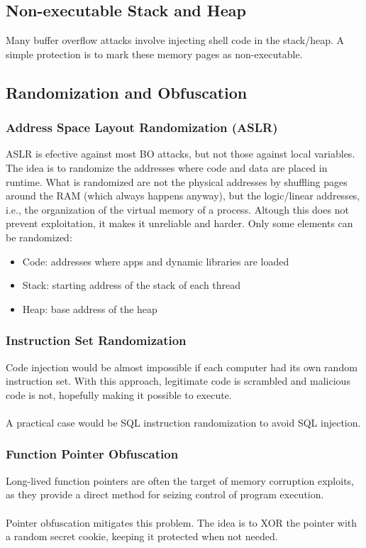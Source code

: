 \documentclass[10pt,a4paper]{report}
\begin{document}
\subsection{Non-executable Stack and Heap}
Many buffer overflow attacks involve injecting shell code in the stack/heap. A simple protection is to mark these memory pages as non-executable.
\subsection{Randomization and Obfuscation}
\subsubsection{Address Space Layout Randomization (ASLR)}
ASLR is efective against most BO attacks, but not those against local variables. The idea is to randomize the addresses where code and data are placed in runtime. What is randomized are not the physical addresses by shuffling pages around the RAM (which always happens anyway), but the logic/linear addresses, i.e., the organization of the virtual memory of a process.
Altough this does not prevent exploitation, it makes it unreliable and harder. Only some elements can be randomized:
\begin{itemize}
\item Code: addresses where apps and dynamic libraries are loaded
\item Stack: starting address of the stack of each thread
\item Heap: base address of the heap
\end{itemize}
\subsubsection{Instruction Set Randomization}
Code injection would be almost impossible if each computer had its own random instruction set. With this approach, legitimate code is scrambled and malicious code is not, hopefully making it possible to execute.\\
\\
A practical case would be SQL  instruction randomization to avoid SQL injection.
\subsubsection{Function Pointer Obfuscation}
Long-lived function pointers are often the target of memory corruption exploits, as they provide a direct method for seizing control of program execution.\\
\\
Pointer obfuscation mitigates this problem. The idea is to XOR the pointer with a random secret cookie, keeping it protected when not needed.
\end{document}
